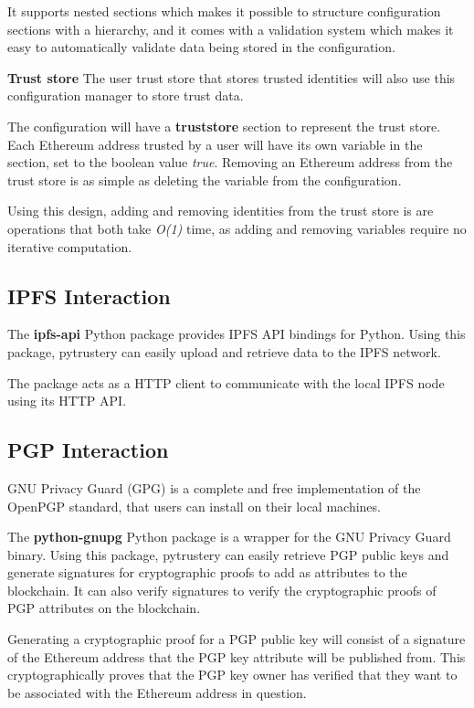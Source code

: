 \documentclass[12pt,a4paper]{report}
\begin{document}
	It supports nested sections which makes it possible to structure configuration sections with a hierarchy, and it comes with a validation system which makes it easy to automatically validate data being stored in the configuration.\cite{19}
	
	\bigskip
	\noindent \textbf{Trust store}\newline
	The user trust store that stores trusted identities will also use this configuration manager to store trust data.
	
	The configuration will have a \textbf{truststore} section to represent the trust store. Each Ethereum address trusted by a user will have its own variable in the section, set to the boolean value \textit{true}. Removing an Ethereum address from the trust store is as simple as deleting the variable from the configuration.
	
	Using this design, adding and removing identities from the trust store is are operations that both take \textit{O(1)} time, as adding and removing variables require no iterative computation.
	
	\subsection{IPFS Interaction}
	The \textbf{ipfs-api} Python package provides IPFS API bindings for Python\cite{20}. Using this package, pytrustery can easily upload and retrieve data to the IPFS network.
	
	The package acts as a HTTP client to communicate with the local IPFS node using its HTTP API.
	
	\subsection{PGP Interaction}
	GNU Privacy Guard (GPG) is a complete and free implementation of the OpenPGP standard, that users can install on their local machines.\cite{22}	
	
	The \textbf{python-gnupg} Python package is a wrapper for the GNU Privacy Guard binary.\cite{21} Using this package, pytrustery can easily retrieve PGP public keys and generate signatures for cryptographic proofs to add as attributes to the blockchain. It can also verify signatures to verify the cryptographic proofs of PGP attributes on the blockchain.
	
	Generating a cryptographic proof for a PGP public key will consist of a signature of the Ethereum address that the PGP key attribute will be published from. This cryptographically proves that the PGP key owner has verified that they want to be associated with the Ethereum address in question.
	
\end{document}
